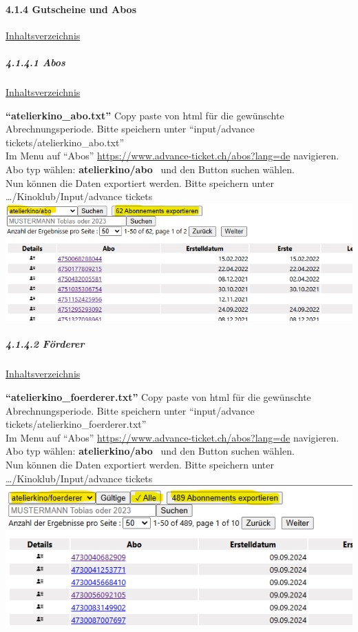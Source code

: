 \documentclass[
]{article}
\begin{document}
\paragraph{4.1.4 Gutscheine und Abos}\label{gutscheine-und-abos}

\hyperref[Inhaltsverzeichnis]{Inhaltsverzeichnis}

\subparagraph{4.1.4.1 Abos}\label{abos}

\hyperref[Inhaltsverzeichnis]{Inhaltsverzeichnis}

\textbf{``atelierkino\_abo.txt''} Copy paste von html für die gewünschte
Abrechnungsperiode. Bitte speichern unter ``input/advance
tickets/atelierkino\_abo.txt''\\
Im Menu auf ``Abos'' \url{https://www.advance-ticket.ch/abos?lang=de}
navigieren.\\
Abo typ wählen: \textbf{atelierkino/abo} ~und den Button suchen
wählen.\\
Nun können die Daten exportiert werden. Bitte speichern unter
\ldots/Kinoklub/Input/advance tickets\\
\includegraphics{doc/atelierkino_abo.png}

\subparagraph{4.1.4.2 Förderer}\label{fuxf6rderer}

\hyperref[Inhaltsverzeichnis]{Inhaltsverzeichnis}

\textbf{``atelierkino\_foerderer.txt''} Copy paste von html für die
gewünschte Abrechnungsperiode. Bitte speichern unter ``input/advance
tickets/atelierkino\_foerderer.txt''\\
Im Menu auf ``Abos'' \url{https://www.advance-ticket.ch/abos?lang=de}
navigieren.\\
Abo typ wählen: \textbf{atelierkino/abo} ~und den Button suchen
wählen.\\
Nun können die Daten exportiert werden. Bitte speichern unter
\ldots/Kinoklub/Input/advance tickets\\
\includegraphics{doc/atelierkino_foerderer.png}
\end{document}
